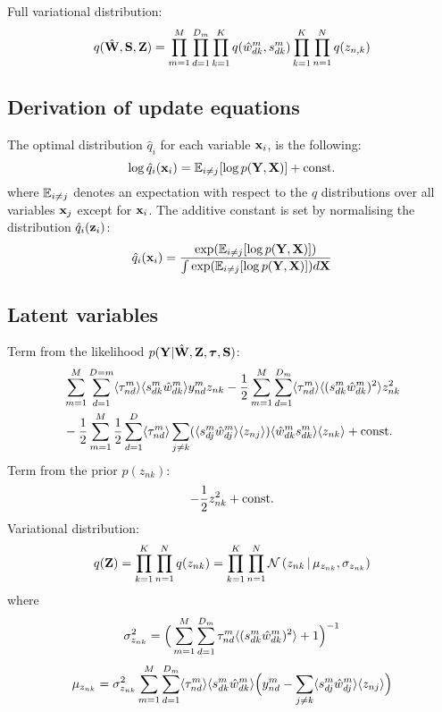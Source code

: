 \documentclass[10pt, a4paper,openany]{report}
\begin{document}
Full variational distribution:
\[
q(\hat{{\bf W}},{\bf S},{\bf Z}) = \prod_{m=1}^{M} \prod_{d=1}^{D_m} \prod_{k=1}^{K} q(\hat{w}_{dk}^m,s_{dk}^m) \prod_{k=1}^{K}\prod_{n=1}^{N} q(z_{n,k})
\]

\subsection{Derivation of update equations}
The optimal distribution $\hat{q}_i$ for each variable ${\bf x}_i$, is the following:
\begin{equation} \label{eq:optimal_q_dist}
\log \hat{q}_i({\bf x}_i) = \mathbb{E}_{i \neq j} [\log p({\bf Y},{\bf X})] + {\rm const.}
\end{equation}
where $\mathbb{E}_{i \neq j}$ denotes an expectation with respect to the $q$ distributions over all variables ${\bf x}_j$ except for ${\bf x}_i$.
The additive constant is set by normalising the distribution $\hat{q}_i({\bf z}_i)$:
\[
\hat{q}_i({\bf x}_i) = \frac{\exp(\mathbb{E}_{i \neq j}[\log p({\bf Y},{\bf X})])}{\int \exp(\mathbb{E}_{i \neq j}[\log p({\bf Y},{\bf X})]) d{\bf X}}
\]

\subsection*{Latent variables}
Term from the likelihood $p({\bf Y}|\hat{{\bf W}},{\bf Z},\mbox{\boldmath $\tau$},{\bf S})$:
\begin{align*}
&\sum_{m=1}^{M} \sum_{d=1}^{D=m} \langle\tau_{nd}^m\rangle \langle s_{dk}^m \hat{w}_{dk}^m \rangle y_{nd}^m z_{nk}
-\frac{1}{2}\sum_{m=1}^{M} \sum_{d=1}^{D_m} \langle\tau_{nd}^m\rangle \langle (s_{dk}^m\hat{w}_{dk}^m)^2 \rangle z_{nk}^2 \\
&-\frac{1}{2}\sum_{m=1}^{M} \frac{1}{2}\sum_{d=1}^{D} \langle\tau_{nd}^m\rangle \sum_{j \neq k} (\langle s_{dj}^m \hat{w}^m_{dj} \rangle \langle z_{nj} \rangle) \langle\hat{w}^m_{dk} s_{dk}^m \rangle \langle z_{nk} \rangle + {\rm const.}
\end{align*}
Term from the prior $p(z_{nk})$:
\[
-\frac{1}{2} z_{nk}^2 + {\rm const.}
\]
Variational distribution:
\[
q({\bf Z}) = \prod_{k=1}^{K} \prod_{n=1}^{N} q(z_{nk}) = \prod_{k=1}^{K} \prod_{n=1}^{N} \mathcal{N}\left(z_{nk} \,|\, \mu_{z_{nk}},\sigma_{z_{nk}}\right)
\]
where
\[
\sigma_{z_{nk}}^2 = \Big( \sum_{m=1}^{M} \sum_{d=1}^{D_m} \tau_{nd}^m \langle (s_{dk}^m\hat{w}_{dk}^m)^2 \rangle + 1 \Big)^{-1}
\]
\[
\mu_{z_{nk}} = \sigma_{z_{nk}}^2 \sum_{m=1}^{M} \sum_{d=1}^{D_m} \langle\tau_{nd}^m\rangle \langle s_{dk}^m\hat{w}_{dk}^m \rangle \Big( y_{nd}^m - \sum_{j \neq k} \langle s_{dj}^m \hat{w}_{dj}^m \rangle \langle z_{nj} \rangle \Big)
\]
\end{document}
